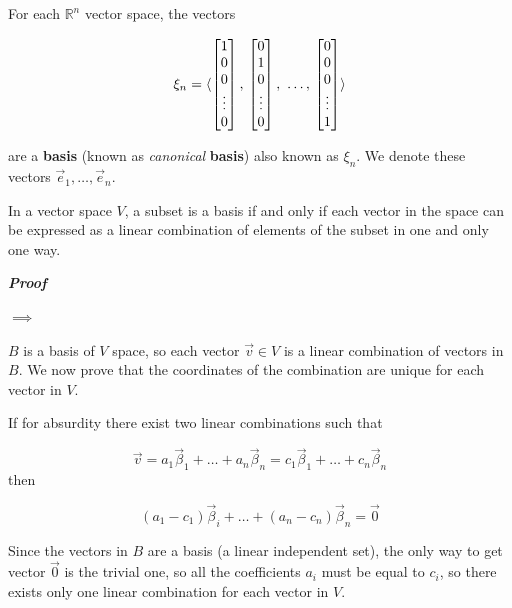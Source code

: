 For each $\mathbb{R}^n$ vector space, the vectors 

$$\xi_n = \langle \begin{bmatrix} 1 \\ 0 \\ 0 \\ \vdots \\ 0\end{bmatrix}, \\ \begin{bmatrix} 0 \\ 1 \\ 0 \\ \vdots \\ 0\end{bmatrix}, \ \dots, \\\begin{bmatrix} 0 \\ 0 \\ 0 \\ \vdots \\ 1\end{bmatrix}\rangle$$ 

are a \textbf{basis} (known as \emph{canonical} \textbf{basis}) also known as $\xi_n$. We denote these vectors $\vec{e}_1, \dots, \vec{e}_n$.



\begin{theorem}
In a vector space $V$, a subset is a basis if and only if each vector
in the space can be expressed as a linear combination of elements of the subset
in one and only one way.

\label{the:unique-lc-basis}
\end{theorem}

\textbf{\textit{Proof}}

$\implies$

$B$ is a basis of $V$ space, so each vector $\vec v \in V$ is a linear combination of vectors in $B$. We now prove that the coordinates of the combination are unique for each vector in $V$.

If for absurdity there exist two linear combinations such that

$$
\vec v = a_1 \vec \beta_1 + \dots + a_n \vec \beta_n = c_1 \vec \beta_1 + \dots + c_n \vec \beta_n
$$
then

$$
(a_1 - c_1) \vec \beta_i + \dots + (a_n - c_n) \vec \beta_n = \vec 0
$$

Since the vectors in $B$ are a basis (a linear independent set), the only way to get vector $\vec 0$ is the trivial one, so all the coefficients $a_i$ must be equal to $c_i$, so there exists only one linear combination for each vector in $V$.

